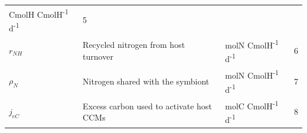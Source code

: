 \documentclass[]{elsarticle} %
\begin{document}
\begin{longtable}[c]{@{}llll@{}}
\begin{minipage}[t]{0.25\columnwidth}\raggedright\strut
CmolH CmolH\textsuperscript{-1} d\textsuperscript{-1}
\strut\end{minipage} &
\begin{minipage}[t]{0.10\columnwidth}\raggedright\strut
5
\strut\end{minipage}\tabularnewline
\begin{minipage}[t]{0.10\columnwidth}\raggedright\strut
\(r_{NH}\)
\strut\end{minipage} &
\begin{minipage}[t]{0.48\columnwidth}\raggedright\strut
Recycled nitrogen from host turnover
\strut\end{minipage} &
\begin{minipage}[t]{0.25\columnwidth}\raggedright\strut
molN CmolH\textsuperscript{-1} d\textsuperscript{-1}
\strut\end{minipage} &
\begin{minipage}[t]{0.10\columnwidth}\raggedright\strut
6
\strut\end{minipage}\tabularnewline
\begin{minipage}[t]{0.10\columnwidth}\raggedright\strut
\(\rho_N\)
\strut\end{minipage} &
\begin{minipage}[t]{0.48\columnwidth}\raggedright\strut
Nitrogen shared with the symbiont
\strut\end{minipage} &
\begin{minipage}[t]{0.25\columnwidth}\raggedright\strut
molN CmolH\textsuperscript{-1} d\textsuperscript{-1}
\strut\end{minipage} &
\begin{minipage}[t]{0.10\columnwidth}\raggedright\strut
7
\strut\end{minipage}\tabularnewline
\begin{minipage}[t]{0.10\columnwidth}\raggedright\strut
\(j_{eC}\)
\strut\end{minipage} &
\begin{minipage}[t]{0.48\columnwidth}\raggedright\strut
Excess carbon used to activate host CCMs
\strut\end{minipage} &
\begin{minipage}[t]{0.25\columnwidth}\raggedright\strut
molC CmolH\textsuperscript{-1} d\textsuperscript{-1}
\strut\end{minipage} &
\begin{minipage}[t]{0.10\columnwidth}\raggedright\strut
8
\strut\end{minipage}\tabularnewline

\end{longtable}
\end{document}
